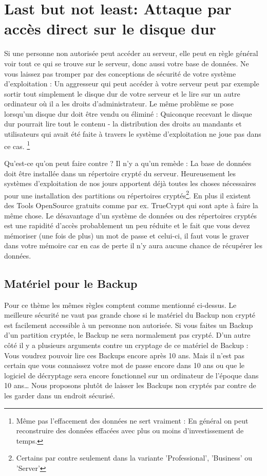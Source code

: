 \section{Last but not least: Attaque par accès direct sur le disque dur}
Si une personne non autorisée peut accéder au serveur, elle peut en règle général voir tout ce qui se trouve sur le serveur, donc aussi votre base de données. Ne vous laissez pas tromper par des conceptions de sécurité de votre système d'exploitation : Un aggresseur qui peut accéder à votre serveur peut par exemple sortir tout simplement le disque dur de votre serveur et le lire sur un autre ordinateur où il a les droits d'administrateur. Le même problème se pose lorsqu'un disque dur doit être vendu ou éliminé : Quiconque recevant le disque dur pourrait lire tout le contenu - la distribution des droits au mandants et utilisateurs qui avait été faite à travers le système d'exploitation ne joue pas dans ce cas. \footnote{Même pas l'effacement des données ne sert vraiment : En général on peut reconstruire des données effacées avec plus ou moins d'investissement de temps.}

\medskip

Qu'est-ce qu'on peut faire contre ? 
Il n'y a qu'un remède : La base de données doit être installée dans un répertoire crypté du serveur. Heureusement les systèmes d'exploitation de nos jours apportent déjà toutes les choses nécessaires pour une installation des partitions ou répertoires cryptés\footnote{Certains par contre seulement dans la variante 'Professional', 'Business' ou 'Server'}. En plus il existent des Tools OpenSource gratuits comme par ex. TrueCrypt qui sont apte à faire la même chose. Le désavantage d'un système de données ou des répertoires cryptés est une rapidité d'accès probablement un peu réduite et le fait que vous devez mémoriser (une fois de plus) un mot de passe et celui-ci, il faut vous le graver dans votre mémoire car en cas de perte il n'y aura aucune chance de récupérer les données.

\subsection{Matériel pour le Backup}
Pour ce thème les mêmes règles comptent comme mentionné ci-dessus. Le meilleure sécurité ne vaut pas grande chose si le matériel du Backup non crypté est facilement accessible à un personne non autorisée. Si vous faites un Backup d'un partition cryptée, le Backup ne sera normalement pas crypté. D'un autre côté il y a plusieurs arguments contre un cryptage de ce matériel de Backup : Vous voudrez pouvoir lire ces Backups encore après 10 ans. Mais il n'est pas certain que vous connaissez votre mot de passe encore dans 10 ans ou que le logiciel de décryptage sera encore fonctionnel sur un ordinateur de l'époque dans 10 ans…
Nous proposons plutôt de laisser les Backups non cryptés par contre de les garder dans un endroit sécurisé. 
